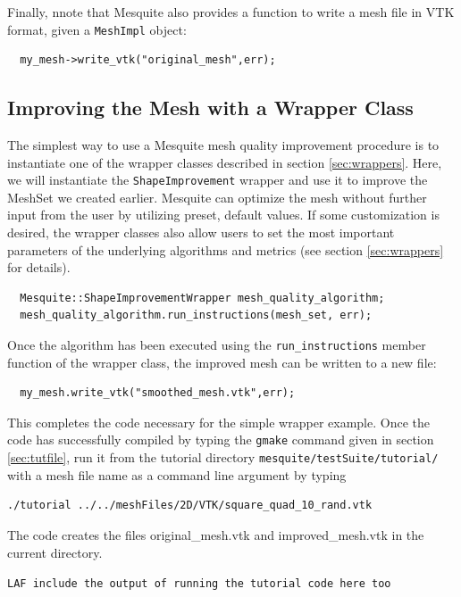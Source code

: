 Finally, nnote that Mesquite also provides a function to write a mesh
file in VTK format, given a \texttt{MeshImpl} object:
\begin{verbatim}
  my_mesh->write_vtk("original_mesh",err); 
\end{verbatim}


\subsection{Improving the Mesh with a Wrapper Class}
\label{sec:tutWrapper}
The simplest way to use a Mesquite mesh quality improvement
procedure is to instantiate one of the wrapper classes described in section
\ref{sec:wrappers}. Here, we will instantiate the
\texttt{ShapeImprovement} wrapper and use it to improve 
the MeshSet we created earlier.  Mesquite can optimize the mesh
without further input from the user by utilizing preset, default
values.  If some customization is desired, the wrapper classes also
allow users to set the most important parameters of the underlying
algorithms and metrics (see section
\ref{sec:wrappers} for details).
\begin{verbatim}
  Mesquite::ShapeImprovementWrapper mesh_quality_algorithm;
  mesh_quality_algorithm.run_instructions(mesh_set, err); 
\end{verbatim}
Once the algorithm has been executed using the {\tt run\_instructions} member
function of the wrapper class, the improved mesh can be written to a new
file:
\begin{verbatim}
  my_mesh.write_vtk("smoothed_mesh.vtk",err); 
\end{verbatim}
This completes the code necessary for the simple wrapper example.  Once
the code has successfully compiled by typing the {\tt gmake} command given in
section \ref{sec:tutfile}, 
run it from the tutorial directory \texttt{mesquite/testSuite/tutorial/}
with a mesh file name as a command line 
argument by typing 
\begin{verbatim}
./tutorial ../../meshFiles/2D/VTK/square_quad_10_rand.vtk
\end{verbatim}
The code creates the files original\_mesh.vtk
and improved\_mesh.vtk in the current directory. 

{\tt LAF include the output of running the tutorial code here too}

